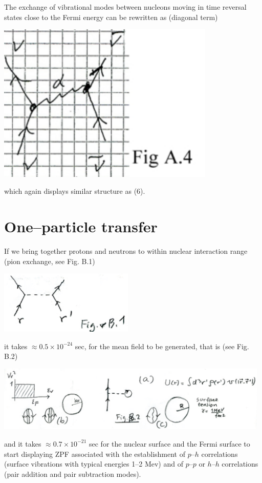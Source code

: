 \documentclass[a4paper,onecolumn,superscriptaddress,12pt,nofootinbib,twoside,raggedfooter,notitlepage]{revtex4-1}
\begin{document}
The exchange of vibrational modes between nucleons moving in time reversal states close to the Fermi energy can be rewritten as (diagonal term)
\begin{center}
	\includegraphics[width=0.78\textwidth]{figs/fig_diagterm}
\end{center}

which again displays similar structure as (6).






\pagebreak

\section{One--particle transfer}
If we bring together protons and neutrons to within nuclear interaction range (pion exchange, see Fig. B.1)
\begin{center}
	\includegraphics[width=0.48\textwidth]{figs/fig_b1}
\end{center}
it takes $\approx 0.5\times10^{-24}$ sec, for the mean field to be generated, that is (see Fig. B.2)
\begin{center}
	\includegraphics[width=0.98\textwidth]{figs/fig_b2}
\end{center}
and it takes $\approx 0.7\times10^{-21}$ sec for the nuclear surface and the Fermi surface to start displaying ZPF associated with the establishment of $p$--$h$ correlations (surface vibrations with typical energies 1--2 Mev) and of $p$--$p$ or $h$--$h$ correlations (pair addition and pair subtraction modes).
\end{document}

